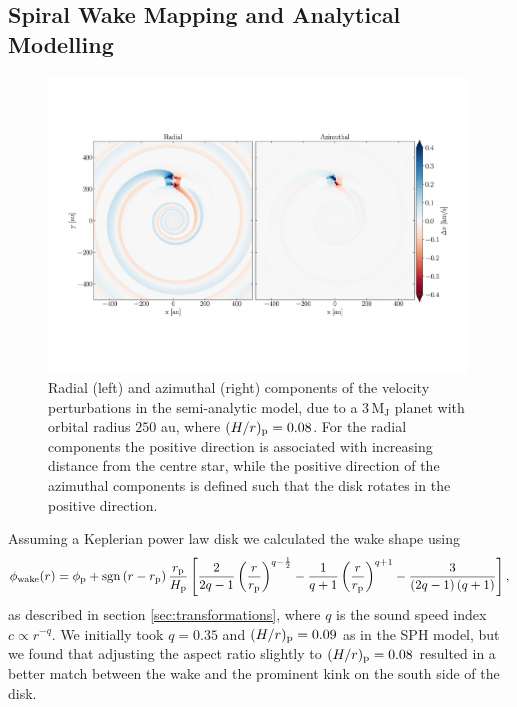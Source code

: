 
\subsection{Spiral Wake Mapping and Analytical Modelling}

\begin{figure}
    \centering
    \includegraphics[width = 0.99\textwidth]{figures/calcino_analytics.pdf}
    \caption{Radial (left) and azimuthal (right) components of the velocity perturbations in the semi-analytic model, due to a $3\, \mathrm{M_J}$ planet with orbital radius $250$ au, where $(H/r)_{\rm p}=0.08$. For the radial components the positive direction is associated with increasing distance from the centre star, while the positive direction of the azimuthal components is defined such that the disk rotates in the positive direction.}
    \label{fig:calcino_analytics}
\end{figure}

Assuming a Keplerian power law disk we calculated the wake shape using \citep{rafikov2002a}
\begin{align}
    \phi_{\rm wake}(r) = \phi_{\rm p} + {\rm sgn} \left( r - r_{\rm p} \right) \frac{r_{\rm p}}{H_{\rm p}} \left[ \frac{2}{2q-1} \left(\frac{r}{r_{\rm p}}\right)^{q-\frac{1}{2}} - \frac{1}{q+1} \left(\frac{r}{r_{\rm p}}\right)^{q+1} - \frac{3}{\left(2q-1\right)\left(q+1\right)} \right], \label{eq:power_law_wake}
\end{align}
as described in section \ref{sec:transformations}, where $q$ is the sound speed index $c \propto r^{-q}$.
We initially took $q=0.35$ and $(H/r)_{\rm p}=0.09$ as in the SPH model, but we found that adjusting the aspect ratio slightly to $(H/r)_{\rm p}=0.08$ resulted in a better match between the wake and the prominent kink on the south side of the disk.

